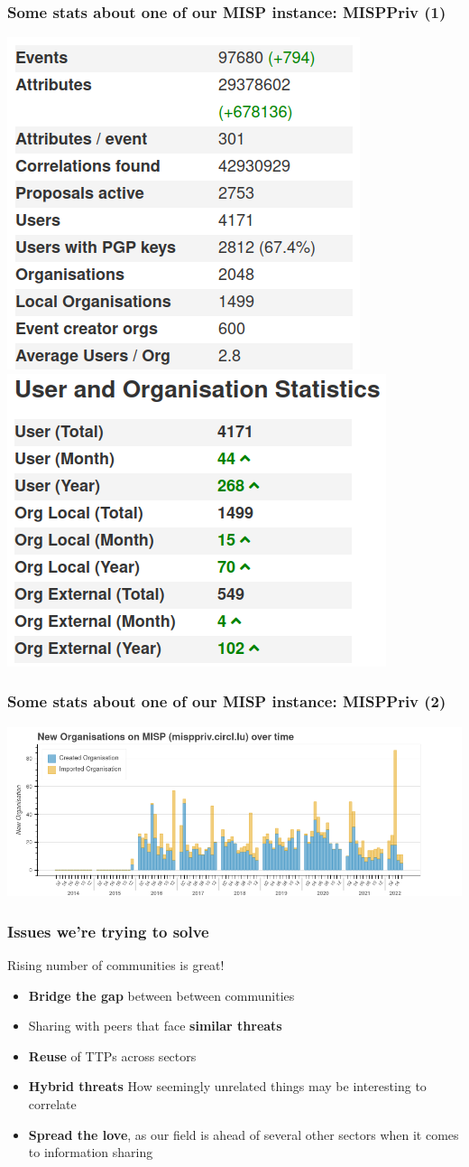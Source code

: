 \begin{frame}
\frametitle{Some stats about one of our MISP instance: MISPPriv (1)}
    \includegraphics[width=0.45\linewidth]{pictures/misppriv-usage.png}
    \includegraphics[width=0.45\linewidth]{pictures/misppriv-user-org-stats.png}
\end{frame}

\begin{frame}
    \frametitle{Some stats about one of our MISP instance: MISPPriv (2)}
    \begin{center}
        \includegraphics[width=1.1\linewidth]{pictures/bokeh_new_org.png}
    \end{center}
\end{frame}

\begin{frame}
\frametitle{Issues we're trying to solve}
    Rising number of communities is great!
    \begin{itemize}
        \item \textbf{Bridge the gap} between between communities
        \item Sharing with peers that face \textbf{similar threats}
        \item \textbf{Reuse} of TTPs across sectors
        \item \textbf{Hybrid threats} How seemingly unrelated things may be interesting to correlate
        \item \textbf{Spread the love}, as our field is ahead of several other sectors when it comes to information sharing
    \end{itemize}
\end{frame}

